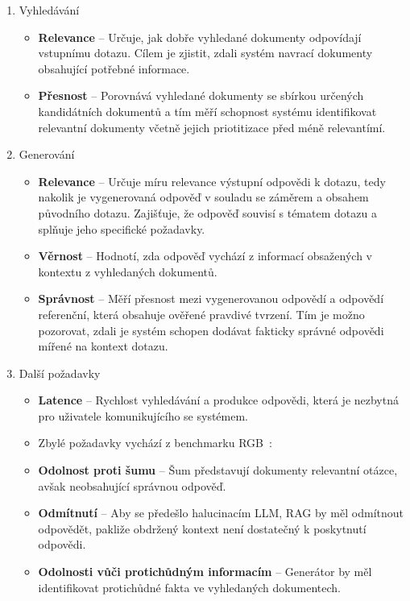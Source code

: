 \begin{enumerate}
    \item Vyhledávání
    \begin{itemize}
        \item \textbf{Relevance} – Určuje, jak dobře vyhledané dokumenty odpovídají vstupnímu dotazu. Cílem je zjistit, zdali systém navrací dokumenty obsahující potřebné informace. 
        \item \textbf{Přesnost} – Porovnává vyhledané dokumenty se sbírkou určených kandidátních dokumentů a tím měří schopnost systému identifikovat relevantní dokumenty včetně jejich priotitizace před méně relevantímí.
    \end{itemize}
    \item Generování
    \begin{itemize}
        \item \textbf{Relevance} – Určuje míru relevance výstupní odpovědi k dotazu, tedy nakolik je vygenerovaná odpověď v souladu se záměrem a obsahem původního dotazu. Zajišťuje, že odpověď souvisí s tématem dotazu a splňuje jeho specifické požadavky.
        \item \textbf{Věrnost} – Hodnotí, zda odpověď vychází z informací obsažených v kontextu z vyhledaných dokumentů.
        \item \textbf{Správnost} – Měří přesnost mezi vygenerovanou odpovědí a odpovědí referenční, která obsahuje ověřené pravdivé tvrzení. Tím je možno pozorovat, zdali je systém schopen dodávat fakticky správné odpovědi mířené na kontext dotazu.
    \end{itemize}
    \item Další požadavky
    \begin{itemize}
        \item \textbf{Latence} – Rychlost vyhledávání a produkce odpovědi, která je nezbytná pro uživatele komunikujícího se systémem.
        \item Zbylé požadavky vychází z benchmarku RGB~\cite{chen2023benchmarkinglargelanguagemodels}:
        \item \textbf{Odolnost proti šumu} – Šum představují dokumenty relevantní otázce, avšak neobsahující správnou odpověď.
        \item \textbf{Odmítnutí} – Aby se předešlo halucinacím LLM, RAG by měl odmítnout odpovědět, pakliže obdržený kontext není dostatečný k poskytnutí odpovědi.
        \item \textbf{Odolnosti vůči protichůdným informacím} – Generátor by měl identifikovat protichůdné fakta ve vyhledaných dokumentech.
    \end{itemize}
\end{enumerate}

